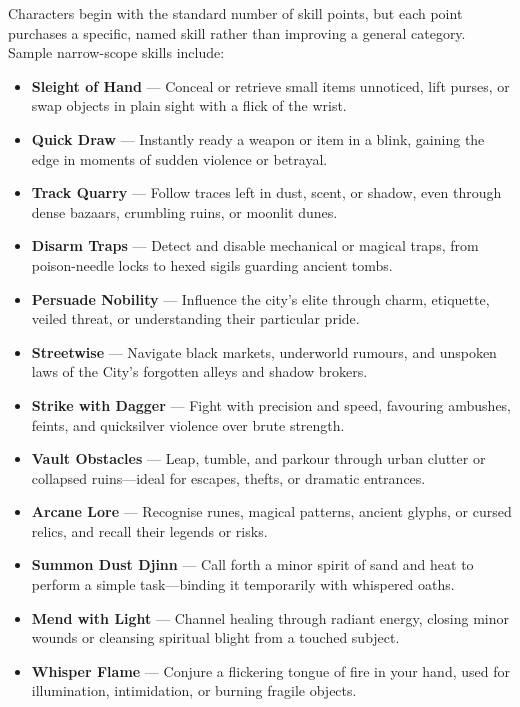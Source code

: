 Characters begin with the standard number of skill points, but each point purchases a specific, named skill rather than improving a general category. Sample narrow-scope skills include:
\begin{itemize}\raggedright
    \item \textbf{Sleight of Hand} — Conceal or retrieve small items unnoticed, lift purses, or swap objects in plain sight with a flick of the wrist.

    \item \textbf{Quick Draw} — Instantly ready a weapon or item in a blink, gaining the edge in moments of sudden violence or betrayal.

    \item \textbf{Track Quarry} — Follow traces left in dust, scent, or shadow, even through dense bazaars, crumbling ruins, or moonlit dunes.

    \item \textbf{Disarm Traps} — Detect and disable mechanical or magical traps, from poison-needle locks to hexed sigils guarding ancient tombs.

    \item \textbf{Persuade Nobility} — Influence the city’s elite through charm, etiquette, veiled threat, or understanding their particular pride.

    \item \textbf{Streetwise} — Navigate black markets, underworld rumours, and unspoken laws of the City’s forgotten alleys and shadow brokers.

    \item \textbf{Strike with Dagger} — Fight with precision and speed, favouring ambushes, feints, and quicksilver violence over brute strength.

    \item \textbf{Vault Obstacles} — Leap, tumble, and parkour through urban clutter or collapsed ruins—ideal for escapes, thefts, or dramatic entrances.

    \item \textbf{Arcane Lore} — Recognise runes, magical patterns, ancient glyphs, or cursed relics, and recall their legends or risks.

    \item \textbf{Summon Dust Djinn} — Call forth a minor spirit of sand and heat to perform a simple task—binding it temporarily with whispered oaths.

    \item \textbf{Mend with Light} — Channel healing through radiant energy, closing minor wounds or cleansing spiritual blight from a touched subject.

    \item \textbf{Whisper Flame} — Conjure a flickering tongue of fire in your hand, used for illumination, intimidation, or burning fragile objects.
\end{itemize}

